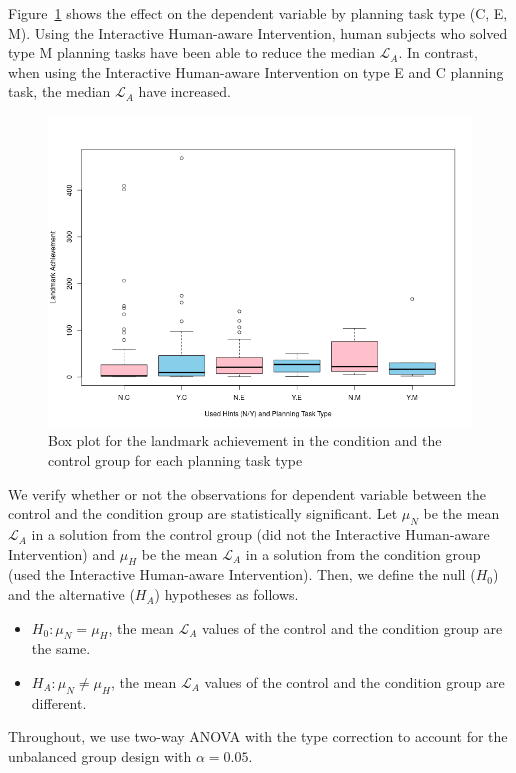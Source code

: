 Figure~\ref{fig:achbytype} shows the effect on the dependent variable by planning task type (C, E, M).
Using the Interactive Human-aware Intervention, human subjects who solved type M planning tasks have been able to reduce the median $\mathcal{L}_A$.
In contrast, when using the Interactive Human-aware Intervention on type E and C planning task, the median $\mathcal{L}_A$ have increased.
\begin{figure}[tpb]
  \centering
\includegraphics[width=0.9\columnwidth]{img/achbytype.png}
  \caption{Box plot for the landmark achievement in the condition and the control group for each planning task type}
  \label{fig:achbytype}
\end{figure}

We verify whether or not the observations for dependent variable between the control and the condition group are statistically significant.
Let $\mu_N$ be the mean $\mathcal{L}_A$ in a solution from the control group (did not the Interactive Human-aware Intervention) and $\mu_H$ be the mean $\mathcal{L}_A$ in a solution from the condition group (used the Interactive Human-aware Intervention).
Then, we define the null ($H_0$) and the alternative ($H_A$) hypotheses as follows.
\begin{itemize}
\item $H_0: \mu_N = \mu_H$, the mean $\mathcal{L}_A$ values of the control and the condition group are the same.
\item $H_A: \mu_N \neq \mu_H$, the mean $\mathcal{L}_A$ values of the control and the condition group are different.
\end{itemize}
Throughout, we use two-way ANOVA with the type  correction to account for the unbalanced group design with $\alpha=0.05$.


